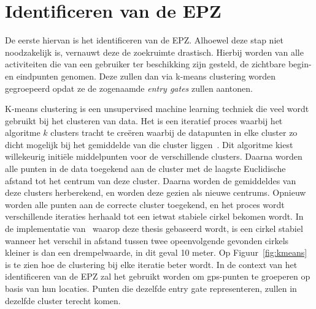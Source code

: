 \section{Identificeren van de EPZ}
De eerste hiervan is het identificeren van de \ac{EPZ}. Alhoewel deze stap niet
noodzakelijk is, vernauwt deze de zoekruimte drastisch. Hierbij worden van alle
activiteiten die van een gebruiker ter beschikking zijn gesteld, de zichtbare
begin- en eindpunten genomen. Deze zullen dan via k-means clustering worden
gegroepeerd opdat ze de zogenaamde \textit{entry gates} zullen aantonen.

K-means clustering is een unsupervised machine learning techniek die veel wordt
gebruikt bij het clusteren van data. Het is een iteratief proces waarbij het
algoritme $k$ clusters tracht te creëren waarbij de datapunten in elke cluster
zo dicht mogelijk bij het gemiddelde van die cluster
liggen~\cite{Understa24:online}. Dit algoritme kiest willekeurig initiële
middelpunten voor de verschillende clusters. Daarna worden alle punten in de
data toegekend aan de cluster met de laagste Euclidische afstand tot het
centrum van deze cluster. Daarna worden de gemiddeldes van deze clusters
herberekend, en worden deze gezien als nieuwe centrums. Opnieuw worden alle
punten aan de correcte cluster toegekend, en het proces wordt verschillende
iteraties herhaald tot een ietwat stabiele cirkel bekomen wordt. In de
implementatie van~\citeauthor{Dhondt_Pochat_Voulimeneas_Joosen_Volckaert_2022}
waarop deze thesis gebaseerd wordt, is een cirkel stabiel wanneer het verschil
in afstand tussen twee opeenvolgende gevonden cirkels kleiner is dan een
drempelwaarde, in dit geval 10
meter\cite{Dhondt_Pochat_Voulimeneas_Joosen_Volckaert_2022, Verdonck_2022}. Op
Figuur~\ref{fig:kmeans} is te zien hoe de clustering bij elke iteratie beter
wordt. In de context van het identificeren van de \ac{EPZ} zal het gebruikt
worden om \ac{gps}-punten te groeperen op basis van hun locaties. Punten die
dezelfde entry gate representeren, zullen in dezelfde cluster terecht komen.

